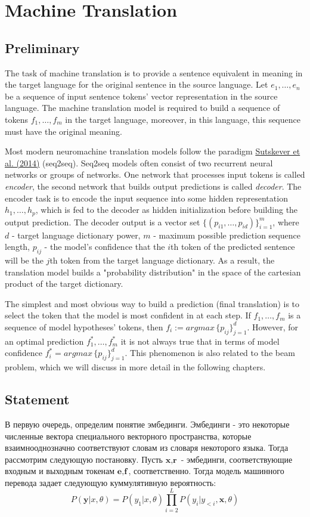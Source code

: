 \documentclass[a4paper,14pt]{extarticle}
\newcommand{\bibref}[3]{\hyperlink{#1}{#2 (#3)}}
\begin{document}
	\section{Machine Translation}
	\subsection{Preliminary}
		The task of machine translation is to provide a sentence equivalent in meaning in the target language for the original sentence in the source language. Let $e_1, \dots, e_n$ be a sequence of input sentence tokens' vector representation in the source language. The machine translation model is required to build a sequence of tokens $f_1, \dots, f_m$ in the target language, moreover, in this language, this sequence must have the original meaning.
	
	Most modern neuromachine translation models follow the paradigm \bibref{seq2seq}{Sutskever et al.}{2014} (seq2seq). Seq2seq models often consist of two recurrent neural networks or groups of networks. One network that processes input tokens is called \textit{encoder}, the second network that builds output predictions is called \textit{decoder}. The encoder task is to encode the input sequence into some hidden representation $h_1, \dots, h_p$, which is fed to the decoder as hidden initialization before building the output prediction. The decoder output is a vector set $\{(p_{i1}, \dots, p_{id})\}_{i=1}^{m}$, where $d$ - target language dictionary power, $m$ - maximum possible prediction sequence length, $p_{ij}$ - the model's confidence that the $i$th token of the predicted sentence will be the $j$th token from the target language dictionary. As a result, the translation model builds a "probability distribution" in the space of the cartesian product of the target dictionary.

	The simplest and most obvious way to build a prediction (final translation) is to select the token that the model is most confident in at each step. If $f_1, \dots, f_m$ is a sequence of model hypotheses' tokens, then $f_i := argmax \, \{p_{ij}\}_{j=1}^{d}$. However, for an optimal prediction $f_1^*, \dots, f_m^*$ it is not always true that in terms of model confidence $f_i^* = argmax \, \{p_{ij}\}_{j=1}^{d}$. This phenomenon is also related to the beam problem, which we will discuss in more detail in the following chapters.
	\subsection{Statement}
	В первую очередь, определим понятие эмбединги. Эмбединги - это некоторые численные вектора специального векторного пространства, которые взаимнооднозначно соответствуют словам из словаря некоторого языка. Тогда рассмотрим следующую постановку.
	Пусть $\textbf{x}, \textbf{r}$ - эмбединги, соответствующие входным и выходным токенам $\textbf{e}, \textbf{f}$, соответственно. 
	Тогда модель машинного перевода задает следующую куммулятивную вероятность:
	\begin{equation}
		P(\textbf{y} | x, \theta) = P(y_1 | x, \theta) \prod_{i=2}^{L} P(y_i | y_{<i}, \textbf{x}, \theta)
	\end{equation}
	
\end{document}
